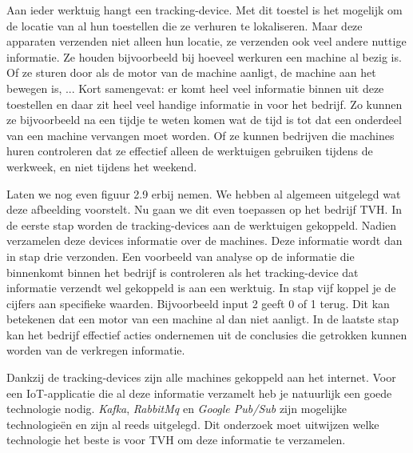 Aan ieder werktuig hangt een tracking-device. Met dit toestel is het mogelijk om de locatie van al hun toestellen die ze verhuren te lokaliseren. Maar deze apparaten verzenden niet alleen hun locatie, ze verzenden ook veel andere nuttige informatie. Ze houden bijvoorbeeld bij hoeveel werkuren een machine al bezig is. Of ze sturen door als de motor van de machine aanligt, de machine aan het bewegen is, ... Kort samengevat: er komt heel veel informatie binnen uit deze toestellen en daar zit heel veel handige informatie in voor het bedrijf. Zo kunnen ze bijvoorbeeld na een tijdje te weten komen wat de tijd is tot dat een onderdeel van een machine vervangen moet worden. Of ze kunnen bedrijven die machines huren controleren dat ze effectief alleen de werktuigen gebruiken tijdens de werkweek, en niet tijdens het weekend.

Laten we nog even figuur 2.9 erbij nemen. We hebben al algemeen uitgelegd wat deze afbeelding voorstelt. Nu gaan we dit even toepassen op het bedrijf TVH. In de eerste stap worden de tracking-devices aan de werktuigen gekoppeld. Nadien verzamelen deze devices informatie over de machines. Deze informatie wordt dan in stap drie verzonden. Een voorbeeld van analyse op de informatie die binnenkomt binnen het bedrijf is controleren als het tracking-device dat informatie verzendt wel gekoppeld is aan een werktuig. In stap vijf koppel je de cijfers aan specifieke waarden. Bijvoorbeeld input 2 geeft 0 of 1 terug. Dit kan betekenen dat een motor van een machine al dan niet aanligt. In de laatste stap kan het bedrijf effectief acties ondernemen uit de conclusies die getrokken kunnen worden van de verkregen informatie.

Dankzij de tracking-devices zijn alle machines gekoppeld aan het internet. Voor een IoT-applicatie die al deze informatie verzamelt heb je natuurlijk een goede technologie nodig. \emph{Kafka}, \emph{RabbitMq} en \emph{Google Pub/Sub} zijn mogelijke technologieën en zijn al reeds uitgelegd. Dit onderzoek moet uitwijzen welke technologie het beste is voor TVH om deze informatie te verzamelen.



